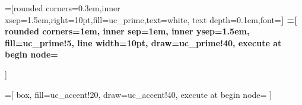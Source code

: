 



\newcommand{\BlueBullets}{
  \renewcommand{\labelitemi}{\textcolor{uc_prime}{$\bullet$}}
  \renewcommand{\labelitemii}{\textcolor{uc_prime}{$\blacktriangleright$}}
}


=[rounded corners=0.3em,inner xsep=1.5em,right=10pt,fill=uc_prime,text=white, text depth=0.1em,font=\bfseries]
=[
  rounded corners=1em,
  inner sep=1em,
  inner ysep=1.5em,
  fill=uc_prime!5,
  line width=10pt,
  draw=uc_prime!40,
  execute at begin node=\BlueBullets
]

=[
  box,
  fill=uc_accent!20,
  draw=uc_accent!40,
  execute at begin node=\BrownBullets
]

% 
% 
\newcommand{\PBlock}[4]{
\begin{tikzpicture}
\node[box] (#1) {\begin{minipage}{\columnwidth-2em}#4\end{minipage}};
\node[heading] at (#1.north west) {#3};
\end{tikzpicture}
}

\newcommand{\Block}[2]{
  \PBlock{some-label}{}{#1}{#2}
}

\renewcommand{\section}[2]{} %
